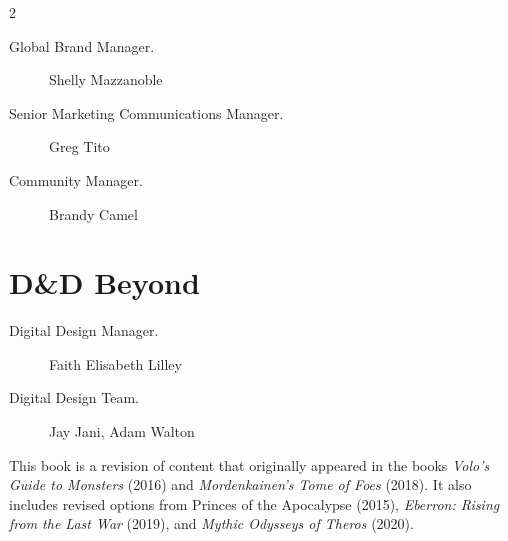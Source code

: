 \documentclass[10pt,a4paper,twoside,bg=print,twocolumn,openany,nodeprecatedcode]{dndbook}
\begin{document}
\begin{description}
\begin{multicols}{2}
\begin{description}
\item[Global Brand Manager.]
Shelly Mazzanoble

\item[Senior Marketing Communications Manager.]
Greg Tito

\item[Community Manager.]
Brandy Camel

\end{description}

\section{D\&D Beyond}

\begin{description}
\item[Digital Design Manager.]
Faith Elisabeth Lilley

\item[Digital Design Team.]
Jay Jani, Adam Walton

\end{description}

\end{multicols}

\end{description}

This book is a revision of content that originally appeared in the books \textit{Volo's Guide to Monsters} (2016) and \textit{Mordenkainen's Tome of Foes} (2018). It also includes revised options from Princes of the Apocalypse (2015), \textit{Eberron: Rising from the Last War} (2019), and \textit{Mythic Odysseys of Theros} (2020).
\end{document}
